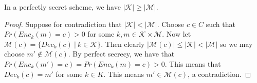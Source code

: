 \documentclass[twoside, a4paper, 10pt]{amsart}
\begin{document}
\begin{prop} In a perfectly secret scheme, we have $|\mathcal{K}| \geq |\mathcal{M}|$.

\end{prop}

\begin{proof} Suppose for contradiction that $|\mathcal{K}| < |\mathcal{M}|$. Choose $c \in C$ such that $Pr(Enc_k(m) = c) > 0$ for some $k,m \in \mathcal{K} \times \mathcal{M}$. Now let $\mathcal{M}(c) = \{ Dec_k(c) ~|~ k \in \mathcal{K} \}$. Then clearly $|\mathcal{M}(c)| \leq |\mathcal{K}| < |\mathcal{M}|$ so we may choose $m' \notin \mathcal{M}(c)$. By perfect secrecy, we have that $Pr(Enc_k(m') = c) = Pr(Enc_k(m) = c) > 0$. This means that $Dec_k(c) = m'$ for some $k \in K$. This means $m' \in \mathcal{M}(c)$, a contradiction.\end{proof}
\end{document}
